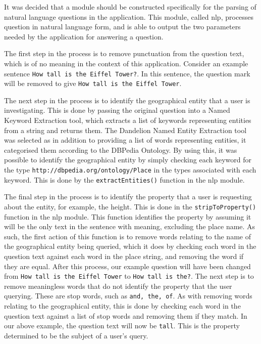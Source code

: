\documentclass[authoryearcitations]{UoYCSproject}
\begin{document}
It was decided that a module should be constructed specifically for the parsing of natural language questions in the application.  This module, called nlp, processes question in natural language form, and is able to output the two parameters needed by the application for answering a question.

The first step in the process is to remove punctuation from the question text, which is of no meaning in the context of this application. Consider an example sentence \texttt{How tall is the Eiffel Tower?}. In this sentence, the question mark will be removed to give \texttt{How tall is the Eiffel Tower}.

\begin{sloppypar} %
The next step in the process is to identify the geographical entity that a user is investigating. This is done by passing the original question into a Named Keyword Extraction tool, which extracts a list of keywords representing entities from a string and returns them. The Dandelion Named Entity Extraction tool was selected as in addition to providing a list of words representing entities, it categorised them according to the DBPedia Ontology. By using this, it was possible to identify the geographical entity by simply checking each keyword for the type \texttt{http://dbpedia.org/ontology/Place} in the types associated with each keyword.  This is done by the \texttt{extractEntities()} function in the nlp module.
\end{sloppypar}

The final step in the process is to identify the property that a user is requesting about the entity, for example, the height. This is done in the \texttt{stripToProperty()} function in the nlp module. This function identifies the property by assuming it will be the only text in the sentence with meaning, excluding the place name. As such, the first action of this function is to remove words relating to the name of the geographical entity being queried, which it does by checking each word in the question text against each word in the place string, and removing the word if they are equal. After this process, our example question will have been changed from \texttt{How tall is the Eiffel Tower} to \texttt{How tall is the?}. The next step is to remove meaningless words that do not identify the property that the user querying. These are stop words, such as \texttt{and, the, of}. As with removing words relating to the geographical entity, this is done by checking each word in the question text against a list of stop words and removing them if they match. In our above example, the question text will now be \texttt{tall}. This is the property determined to be the subject of a user's query.
\end{document}

